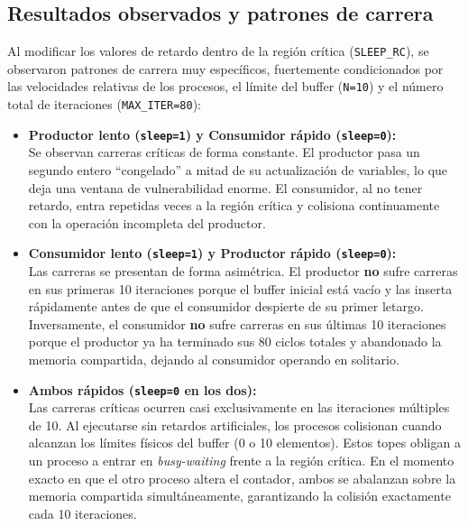 \documentclass[a4paper, 12pt]{article}
\newcommand{\ic}[1]{\texttt{#1}}
\begin{document}
\subsection{Resultados observados y patrones de carrera}

Al modificar los valores de retardo dentro de la región crítica (\ic{SLEEP\_RC}), se observaron patrones de carrera muy específicos, fuertemente condicionados por las velocidades relativas de los procesos, el límite del buffer (\ic{N=10}) y el número total de iteraciones (\ic{MAX\_ITER=80}):

\begin{itemize}
  \item \textbf{Productor lento (\ic{sleep=1}) y Consumidor rápido (\ic{sleep=0}):}\\
        Se observan carreras críticas de forma constante. El productor pasa un segundo entero ``congelado'' a mitad de su actualización de variables, lo que deja una ventana de vulnerabilidad enorme. El consumidor, al no tener retardo, entra repetidas veces a la región crítica y colisiona continuamente con la operación incompleta del productor.
        
  \item \textbf{Consumidor lento (\ic{sleep=1}) y Productor rápido (\ic{sleep=0}):}\\
        Las carreras se presentan de forma asimétrica. El productor \textbf{no} sufre carreras en sus primeras 10 iteraciones porque el buffer inicial está vacío y las inserta rápidamente antes de que el consumidor despierte de su primer letargo. Inversamente, el consumidor \textbf{no} sufre carreras en sus últimas 10 iteraciones porque el productor ya ha terminado sus 80 ciclos totales y abandonado la memoria compartida, dejando al consumidor operando en solitario.
        
  \item \textbf{Ambos rápidos (\ic{sleep=0} en los dos):}\\
        Las carreras críticas ocurren casi exclusivamente en las iteraciones múltiples de 10. Al ejecutarse sin retardos artificiales, los procesos colisionan cuando alcanzan los límites físicos del buffer (0 o 10 elementos). Estos topes obligan a un proceso a entrar en \emph{busy-waiting} frente a la región crítica. En el momento exacto en que el otro proceso altera el contador, ambos se abalanzan sobre la memoria compartida simultáneamente, garantizando la colisión exactamente cada 10 iteraciones.
\end{itemize}
\end{document}
